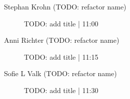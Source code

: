 \begin{symposium}
\begin{description}
                \item [Stephan Krohn (TODO: refactor name)] TODO: add title \textcolor{mygray}{ | 11:00}    
                
                \item [Anni Richter (TODO: refactor name)] TODO: add title \textcolor{mygray}{ | 11:15}    
                
                \item [Sofie L Valk (TODO: refactor name)] TODO: add title \textcolor{mygray}{ | 11:30}    
                
            \end{description} 
            \end{symposium}
            